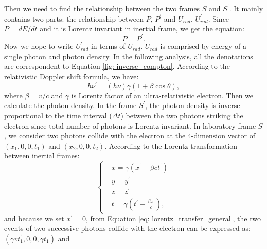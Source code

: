 \documentclass[a4paper, 12pt]{report}
\begin{document}
      Then we need to find the relationship between the two frames $S$ and $S^{\prime}$. 
      It mainly contains two parts: the relationship between $P$, $P^{\prime}$ and 
      $U_{rad}$, $U_{rad}^{\prime}$. Since $P = dE/dt$ and it is Lorentz invariant 
      in inertial frame, we get the equation: 
      \begin{equation}
        \label{eq: power_is_equal}
        P = P^{\prime} .
      \end{equation}
      Now we hope to write $U_{rad}^{\prime}$ in terms of $U_{rad}$. $U_{rad}$ is 
      comprised by energy of a single photon and photon density. In the following
      analysis, all the denotations are correspondent to Equation \ref{fig: inverse_compton}. 
      According to the relativistic Doppler shift formula, we have: 
      \begin{equation}
        \label{eq: doppler_shift}
        h \nu^{\prime} = \left(h \nu\right) \gamma \left(1 + \beta \cos{\theta} \right) ,
      \end{equation}
      where $\beta = v / c$ and $\gamma$ is Lorentz factor of an ultra-relativistic 
      electron. Then we calculate the photon density. In the frame $S^{\prime}$, the 
      photon density is inverse proportional to the time interval ($\Delta t$) between 
      the two photons striking the electron since total number of photons is Lorentz 
      invariant. In laboratory frame $S$, we consider two photons collide with the 
      electron at the 4-dimension vector of 
      $\left(x_{1}, 0, 0, t_{1}\right)$ and $\left(x_{2}, 0, 0, t_{2}\right)$. 
      According to the Lorentz transformation between inertial frames: 
      \begin{equation}
        \label{eq: lorentz_transfer_general}
          \begin{cases}
            & x = \gamma \left( x^{\prime} + \beta c t^{\prime} \right)\\
            & y = y^{\prime} \\
            & z = z^{\prime} \\ 
            & t = \gamma \left(t^{\prime} + \frac{\beta x^{\prime}}{c}\right) ,
          \end{cases}       
      \end{equation}
      and because we set $x^{\prime} = 0$, from Equation \ref{eq: lorentz_transfer_general}, 
      the two events of two successive photons collide with the electron can be 
      expressed as:
      $\left(\gamma v t_{1}^{\prime}, 0, 0, \gamma t_{1}^{\prime}\right)$ and 
\end{document}
